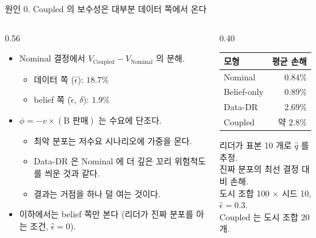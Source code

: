 \documentclass[aspectratio=169,11pt]{beamer}
\newcommand{\heps}{\hat{\epsilon}}
\newcommand{\teps}{\tilde{\epsilon}}
\begin{document}
\begin{frame}{원인 0. Coupled 의 보수성은 대부분 데이터 쪽에서 온다}
\begin{columns}[T]
\begin{column}{0.56\textwidth}
\begin{itemize}
  \item Nominal 결정에서 $V_{\text{Coupled}} - V_{\text{Nominal}}$ 의 분해.
  \begin{itemize}
    \item 데이터 쪽 ($\heps$): $18.7\%$
    \item belief 쪽 ($\teps$, $\delta$): $1.9\%$
  \end{itemize}
  \item $\phi = -v \times (\text{B 판매})$ 는 수요에 단조다.
  \begin{itemize}
    \item 최악 분포는 저수요 시나리오에 가중을 몬다.
    \item Data-DR 은 Nominal 에 더 깊은 꼬리 위험척도를 씌운 것과 같다.
    \item 결과는 거점을 하나 덜 여는 것이다.
  \end{itemize}
  \item 이하에서는 belief 쪽만 본다 (리더가 진짜 분포를 아는 조건, $\heps = 0$).
\end{itemize}
\end{column}
\begin{column}{0.40\textwidth}
\centering
\small
\begin{tabular}{lr}
\toprule
모형 & 평균 손해\\
\midrule
Nominal & $0.84\%$\\
Belief-only & $0.89\%$\\
Data-DR & $2.69\%$\\
Coupled & 약 $2.8\%$\\
\bottomrule
\end{tabular}

\vspace{0.6em}
{\footnotesize 리더가 표본 10 개로 $\hat q$ 를 추정.\\ 진짜 분포의 최선 결정 대비 손해.\\ 도시 조합 100 $\times$ 시드 10, $\heps = 0.3$.\\ Coupled 는 도시 조합 20 개.}
\end{column}
\end{columns}
\end{frame}
\end{document}
